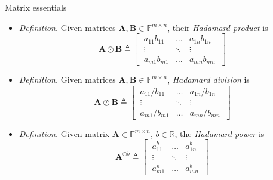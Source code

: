 \documentclass{beamer}
\numberwithin{equation}{section}
\begin{document}
\begin{frame}{Matrix essentials}
    \begin{itemize}
        \item
        \textit{Definition.} Given matrices $ \mathbf{A}, \mathbf{B} \in
        \mathbb{F}^{m \times n} $, their \textit{Hadamard product} is
        \begin{equation*}
            \mathbf{A} \odot \mathbf{B} \triangleq \begin{bmatrix}
                \ a_{11}b_{11} & \ldots & a_{1n}b_{1n} \ \\
                \ \vdots & \ddots & \vdots \ \\
                \ a_{m1}b_{m1} & \ldots & a_{mn}b_{mn} \
            \end{bmatrix}
        \end{equation*}

        \item
        \textit{Definition.} Given matrices $ \mathbf{A}, \mathbf{B} \in
        \mathbb{F}^{m \times n} $, \textit{Hadamard division} is
        \begin{equation*}
            \mathbf{A} \oslash \mathbf{B} \triangleq \begin{bmatrix}
                \ a_{11} / b_{11} & \ldots & a_{1n} / b_{1n} \ \\
                \ \vdots & \ddots & \vdots \ \\
                \ a_{m1} / b_{m1} & \ldots & a_{mn} / b_{mn} \
            \end{bmatrix}
        \end{equation*}

        \item
        \textit{Definition.} Given matrix $ \mathbf{A} \in
        \mathbb{F}^{m \times n} $, $ b \in \mathbb{R} $, the
        \textit{Hadamard power} is
        \begin{equation*}
            \mathbf{A}^{\odot b} \triangleq \begin{bmatrix}
                \ a_{11}^b & \ldots & a_{1n}^b \ \\
                \ \vdots & \ddots & \vdots \ \\
                \ a_{m1}^n & \ldots & a_{mn}^b \
            \end{bmatrix}
        \end{equation*}
    \end{itemize}
\end{frame}
\end{document}
